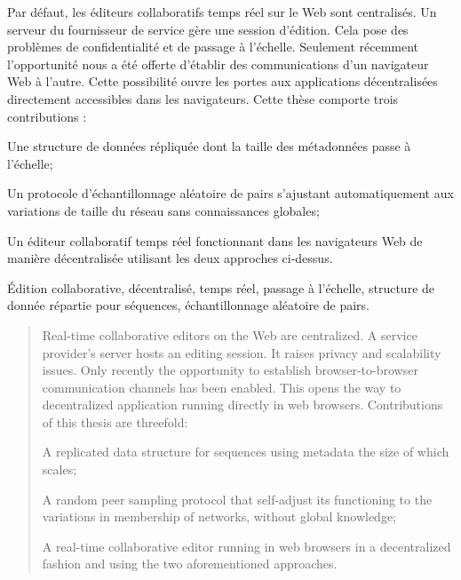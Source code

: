 
\begin{resume}
  Par défaut, les éditeurs collaboratifs temps réel sur le Web sont
  centralisés. Un serveur du fournisseur de service gère une session
  d'édition. Cela pose des problèmes de confidentialité et de passage à
  l'échelle.  Seulement récemment l'opportunité nous a été offerte d'établir des
  communications d'un navigateur Web à l'autre. Cette possibilité ouvre les
  portes aux applications décentralisées directement accessibles dans les
  navigateurs. Cette thèse comporte trois contributions :
  \begin{inparaenum}[(i)]
  \item Une structure de données répliquée dont la taille des métadonnées passe
    à l'échelle;
  \item Un protocole d'échantillonnage aléatoire de pairs s'ajustant
    automatiquement aux variations de taille du réseau sans connaissances
    globales;
  \item Un éditeur collaboratif temps réel fonctionnant dans les navigateurs Web
    de manière décentralisée utilisant les deux approches ci-dessus.
  \end{inparaenum}
\end{resume}

\begin{motscles}
  Édition collaborative, décentralisé, temps réel, passage à l'échelle,
  structure de donnée répartie pour séquences, échantillonnage aléatoire de
  pairs.
\end{motscles}

\begin{abstract}
  Real-time collaborative editors on the Web are centralized. A service
  provider's server hosts an editing session. It raises privacy and scalability
  issues. Only recently the opportunity to establish browser-to-browser
  communication channels has been enabled. This opens the way to decentralized
  application running directly in web browsers. Contributions of this thesis are
  threefold: 
  \begin{inparaenum}[(i)]
  \item A replicated data structure for sequences using metadata the size of
    which scales;
  \item A random peer sampling protocol that self-adjust its functioning to
    the variations in membership of networks, without global knowledge;
  \item A real-time collaborative editor running in web browsers in a
    decentralized fashion and using the two aforementioned approaches.
  \end{inparaenum}
\end{abstract}

